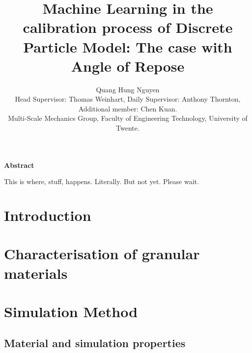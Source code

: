 \documentclass{article}
\title{Machine Learning in the calibration process of Discrete Particle Model: The case with Angle of Repose}
\author{Quang Hung Nguyen\\[1ex] \small Head Supervisor: Thomas Weinhart, Daily Supervisor: Anthony Thornton, Additional member: Chen Kuan. \\
\small Multi-Scale Mechanics Group, Faculty of Engineering Technology, University of Twente.}
\date{}
\begin{document}
\maketitle

\begin{center}
    \Large\textbf{Abstract}
\end{center}


\begin{center}
    This is where, stuff, happens. Literally. But not yet. Please wait. 
\end{center}



\pagebreak

\tableofcontents

\pagebreak

\section{Introduction}\label{section:Introduction}



% 


% 


\section{Characterisation of granular materials}





\section{Simulation Method}\label{section:ExpMethod}






\subsection{Material and simulation properties}\label{section:matprop}
\end{document}
